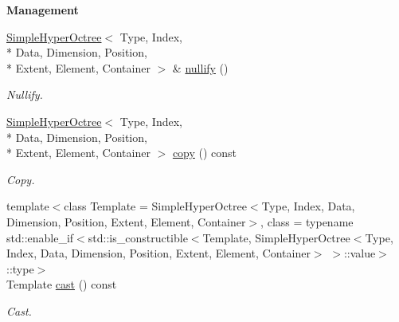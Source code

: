 \begin{Indent}{\bf Management}\par
\begin{DoxyCompactItemize}
\item 
\hyperlink{exceptionmagrathea_1_1SimpleHyperOctree}{Simple\-Hyper\-Octree}$<$ Type, Index, \\*
Data, Dimension, Position, \\*
Extent, Element, Container $>$ \& \hyperlink{exceptionmagrathea_1_1SimpleHyperOctree_a4334e4b4f36159fc544eea4c81db686d}{nullify} ()
\begin{DoxyCompactList}\small\item\em Nullify. \end{DoxyCompactList}\item 
\hyperlink{exceptionmagrathea_1_1SimpleHyperOctree}{Simple\-Hyper\-Octree}$<$ Type, Index, \\*
Data, Dimension, Position, \\*
Extent, Element, Container $>$ \hyperlink{exceptionmagrathea_1_1SimpleHyperOctree_a84149cd7e224b0e1d1ff3977fa2b11d3}{copy} () const 
\begin{DoxyCompactList}\small\item\em Copy. \end{DoxyCompactList}\item 
{\footnotesize template$<$class Template  = Simple\-Hyper\-Octree$<$\-Type, Index, Data, Dimension, Position, Extent, Element, Container$>$, class  = typename std\-::enable\-\_\-if$<$std\-::is\-\_\-constructible$<$\-Template, Simple\-Hyper\-Octree$<$\-Type, Index, Data, Dimension, Position, Extent, Element, Container$>$ $>$\-::value$>$\-::type$>$ }\\Template \hyperlink{exceptionmagrathea_1_1SimpleHyperOctree_a96bb74baaceebc3244ecbe66746a52c9}{cast} () const 
\begin{DoxyCompactList}\small\item\em Cast. \end{DoxyCompactList}\end{DoxyCompactItemize}
\end{Indent}

